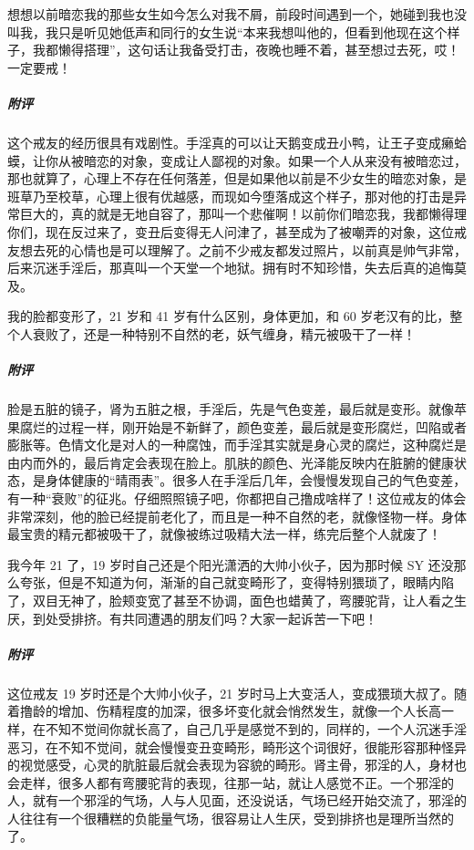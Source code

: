 \begin{case}[变丑]
    想想以前暗恋我的那些女生如今怎么对我不屑，前段时间遇到一个，她碰到我也没叫我，我只是听见她低声和同行的女生说“本来我想叫他的，但看到他现在这个样子，我都懒得搭理”，这句话让我备受打击，夜晚也睡不着，甚至想过去死，哎！一定要戒！
    \subparagraph{附评} 这个戒友的经历很具有戏剧性。手淫真的可以让天鹅变成丑小鸭，让王子变成癞蛤蟆，让你从被暗恋的对象，变成让人鄙视的对象。如果一个人从来没有被暗恋过，那也就算了，心理上不存在任何落差，但是如果他以前是不少女生的暗恋对象，是班草乃至校草，心理上很有优越感，而现如今堕落成这个样子，那对他的打击是异常巨大的，真的就是无地自容了，那叫一个悲催啊！以前你们暗恋我，我都懒得理你们，现在反过来了，变丑后变得无人问津了，甚至成为了被嘲弄的对象，这位戒友想去死的心情也是可以理解了。之前不少戒友都发过照片，以前真是帅气非常，后来沉迷手淫后，那真叫一个天堂一个地狱。拥有时不知珍惜，失去后真的追悔莫及。
\end{case}

\begin{case}[变丑]
    我的脸都变形了，21 岁和 41 岁有什么区别，身体更加，和 60 岁老汉有的比，整个人衰败了，还是一种特别不自然的老，妖气缠身，精元被吸干了一样！
    \subparagraph{附评} 脸是五脏的镜子，肾为五脏之根，手淫后，先是气色变差，最后就是变形。就像苹果腐烂的过程一样，刚开始是不新鲜了，颜色变差，最后就是变形腐烂，凹陷或者膨胀等。色情文化是对人的一种腐蚀，而手淫其实就是身心灵的腐烂，这种腐烂是由内而外的，最后肯定会表现在脸上。肌肤的颜色、光泽能反映内在脏腑的健康状态，是身体健康的“晴雨表”。很多人在手淫后几年，会慢慢发现自己的气色变差，有一种“衰败”的征兆。仔细照照镜子吧，你都把自己撸成啥样了！这位戒友的体会非常深刻，他的脸已经提前老化了，而且是一种不自然的老，就像怪物一样。身体最宝贵的精元都被吸干了，就像被练过吸精大法一样，练完后整个人就废了！
\end{case}

\begin{case}[变丑]
    我今年 21 了，19 岁时自己还是个阳光潇洒的大帅小伙子，因为那时候 SY 还没那么夸张，但是不知道为何，渐渐的自己就变畸形了，变得特别猥琐了，眼睛内陷了，双目无神了，脸颊变宽了甚至不协调，面色也蜡黄了，弯腰驼背，让人看之生厌，到处受排挤。有共同遭遇的朋友们吗？大家一起诉苦一下吧！
    \subparagraph{附评} 这位戒友 19 岁时还是个大帅小伙子，21 岁时马上大变活人，变成猥琐大叔了。随着撸龄的增加、伤精程度的加深，很多坏变化就会悄然发生，就像一个人长高一样，在不知不觉间你就长高了，自己几乎是感觉不到的，同样的，一个人沉迷手淫恶习，在不知不觉间，就会慢慢变丑变畸形，畸形这个词很好，很能形容那种怪异的视觉感受，心灵的肮脏最后就会表现为容貌的畸形。肾主骨，邪淫的人，身材也会走样，很多人都有弯腰驼背的表现，往那一站，就让人感觉不正。一个邪淫的人，就有一个邪淫的气场，人与人见面，还没说话，气场已经开始交流了，邪淫的人往往有一个很糟糕的负能量气场，很容易让人生厌，受到排挤也是理所当然的了。
\end{case}


